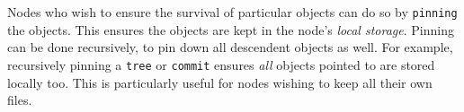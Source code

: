 \documentclass{sig-alternate}
\begin{document}
Nodes who wish to ensure the survival of particular objects can do so by
\texttt{pinning} the objects. This ensures the objects are kept in the node's
\textit{local storage}. Pinning can be done recursively, to pin down all
descendent objects as well. For example, recursively pinning a \texttt{tree}
or \texttt{commit} ensures \textit{all} objects pointed to are stored locally
too. This is particularly useful for nodes wishing to keep all their own files.




%
%
\end{document}
